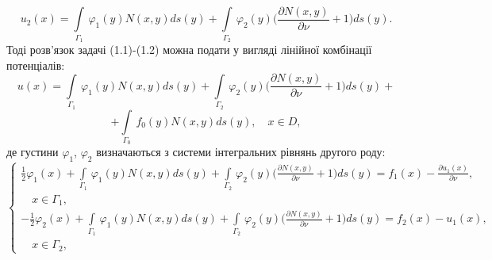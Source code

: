 \documentclass[a4 paper,12pt,ukrainian]{report}
\begin{document}
\begin{equation}
u_{2}(x) = \int\limits_{\Gamma_{1}} \, \varphi_{1}(y)N(x,y)ds(y)+\int\limits_{\Gamma_{2}} \, \varphi_{2}(y)\bigg(\frac{\partial N(x,y)}{\partial\nu} + 1\bigg)ds(y). 
\end{equation}
\hspace*{\parindent}Тоді розв'язок задачі (1.1)-(1.2) можна подати у вигляді лінійної комбінації потенціалів:
\begin{equation}
u(x) = \int\limits_{\Gamma_{1}} \, \varphi_{1}(y)N(x,y)ds(y)+\int\limits_{\Gamma_{2}} \, \varphi_{2}(y)\bigg(\frac{\partial N(x,y)}{\partial\nu} + 1\bigg)ds(y)+
\end{equation}
\begin{equation*}
+\int\limits_{\Gamma_{0}} \, f_{0}(y)N(x,y) ds(y), \quad x \in D,
\end{equation*}
де густини $\varphi_{1}$, $\varphi_{2}$ визначаються з системи інтегральних рівнянь другого роду:
\begin{equation}\label{13}
 \left\{
\begin{array}{c}
   \displaystyle
\frac{1}{2}\varphi_{1}(x) + \int\limits_{\Gamma_1} \, \varphi_1(y)N(x,y)ds(y)+\int\limits_{\Gamma_2} \, \varphi_2(y)\bigg(\frac{\partial N(x,y)}{\partial\nu} + 1\bigg)ds(y)=f_1(x)-\frac{\partial u_{1}(x)}{\partial\nu},\\ \quad x\in \Gamma_1,\\

	\displaystyle
  -\frac{1}{2}\varphi_{2}(x) + \int\limits_{\Gamma_1} \, \varphi_1(y)N(x,y)ds(y)+\int\limits_{\Gamma_2} \, \varphi_2(y)\bigg(\frac{\partial N(x,y)}{\partial\nu} + 1\bigg)ds(y)=f_2(x)-u_{1}(x),\\ \quad x\in \Gamma_2,
 \end{array}
\right.
\end{equation}


\newpage
\end{document}
